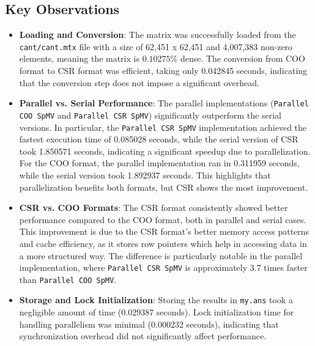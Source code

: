 \documentclass[12pt]{article}
\begin{document}
\subsection{Key Observations}
\begin{itemize}
    \item \textbf{Loading and Conversion}:
    The matrix was successfully loaded from the \texttt{cant/cant.mtx} file with a size of 62,451 x 62,451 and 4,007,383 non-zero elements, meaning the matrix is $0.10275\%$ dense. The conversion from COO format to CSR format was efficient, taking only 0.042845 seconds, indicating that the conversion step does not impose a significant overhead.

    \item \textbf{Parallel vs. Serial Performance}:
    The parallel implementations (\texttt{Parallel COO SpMV} and \texttt{Parallel CSR SpMV}) significantly outperform the serial versions. In particular, the \texttt{Parallel CSR SpMV} implementation achieved the fastest execution time of 0.085028 seconds, while the serial version of CSR took 1.850571 seconds, indicating a significant speedup due to parallelization. For the COO format, the parallel implementation ran in 0.311959 seconds, while the serial version took 1.892937 seconds. This highlights that parallelization benefits both formats, but CSR shows the most improvement.

    \item \textbf{CSR vs. COO Formats}:
    The CSR format consistently showed better performance compared to the COO format, both in parallel and serial cases. This improvement is due to the CSR format's better memory access patterns and cache efficiency, as it stores row pointers which help in accessing data in a more structured way. The difference is particularly notable in the parallel implementation, where \texttt{Parallel CSR SpMV} is approximately 3.7 times faster than \texttt{Parallel COO SpMV}.

    \item \textbf{Storage and Lock Initialization}:
    Storing the results in \texttt{my.ans} took a negligible amount of time (0.029387 seconds). Lock initialization time for handling parallelism was minimal (0.000232 seconds), indicating that synchronization overhead did not significantly affect performance.
\end{itemize}
\end{document}
